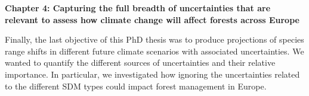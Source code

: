 \vspace*{0.5cm}

\textbf{Chapter 4: Capturing the full breadth of uncertainties that are relevant to assess how climate change will affect forests across Europe}

\vspace*{0.1cm}

\noindent Finally, the last objective of this PhD thesis was to produce projections of species range shifts in different future climate scenarios with associated uncertainties. We wanted to quantify the different sources of uncertainties and their relative importance. In particular, we investigated how ignoring the uncertainties related to the different SDM types could impact forest management in Europe.

\newpage
\
\newpage